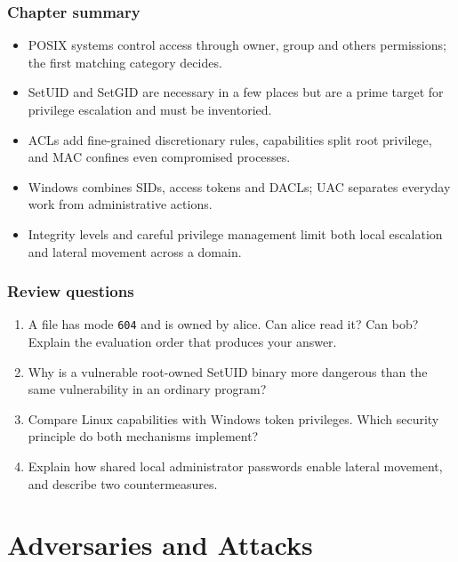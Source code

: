 \documentclass[11pt,openany]{book}
\begin{document}
\section*{Chapter summary}
\begin{itemize}
  \item POSIX systems control access through owner, group and others permissions; the first matching category decides.
  \item SetUID and SetGID are necessary in a few places but are a prime target for privilege escalation and must be inventoried.
  \item ACLs add fine-grained discretionary rules, capabilities split root privilege, and MAC confines even compromised processes.
  \item Windows combines SIDs, access tokens and DACLs; UAC separates everyday work from administrative actions.
  \item Integrity levels and careful privilege management limit both local escalation and lateral movement across a domain.
\end{itemize}

\section*{Review questions}
\begin{enumerate}
  \item A file has mode \texttt{604} and is owned by alice. Can alice read it? Can bob? Explain the evaluation order that produces your answer.
  \item Why is a vulnerable root-owned SetUID binary more dangerous than the same vulnerability in an ordinary program?
  \item Compare Linux capabilities with Windows token privileges. Which security principle do both mechanisms implement?
  \item Explain how shared local administrator passwords enable lateral movement, and describe two countermeasures.
\end{enumerate}

\part{Adversaries and Attacks}
\end{document}
